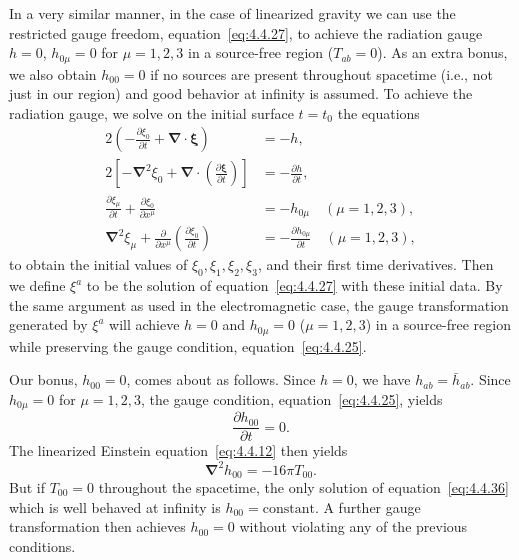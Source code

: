 In a very similar manner, in the case of linearized gravity we can use the restricted
gauge freedom, equation~\eqref{eq:4.4.27}, to achieve the radiation gauge
\(h=0\), \(h_{0\mu}=0\) for \(\mu=1,2,3\) in a source-free region
(\(T_{ab}=0\)). As an extra bonus, we also obtain \(h_{00}=0\) if no sources are
present throughout spacetime (i.e., not just in our region) and good behavior at
infinity is assumed. To achieve the radiation gauge, we solve on the initial surface
\(t=t_0\) the equations
\begin{align}
  2\left(-\frac{\partial\xi_0}{\partial t}
    +\boldsymbol{\nabla}\mathbin{\cdot}\boldsymbol{\xi}\right)&=-h ,
    \tag{4.4.34a}\label{eq:4.4.34a}\\
  2\left[-\boldsymbol{\nabla}^2\xi_0
    +\boldsymbol{\nabla}\mathbin{\cdot}
      \left(\frac{\partial\boldsymbol{\xi}}{\partial t}\right)\right]
    &=-\frac{\partial h}{\partial t} ,
    \tag{4.4.34b}\label{eq:4.4.34b}\\
  \frac{\partial\xi_\mu}{\partial t}
    +\frac{\partial\xi_0}{\partial x^\mu}&=-h_{0\mu}
    \quad(\mu=1,2,3) ,
    \tag{4.4.34c}\label{eq:4.4.34c}\\
  \boldsymbol{\nabla}^2\xi_\mu
    +\frac{\partial}{\partial x^\mu}
      \left(\frac{\partial\xi_0}{\partial t}\right)
    &=-\frac{\partial h_{0\mu}}{\partial t}
    \quad(\mu=1,2,3) ,
    \tag{4.4.34d}\label{eq:4.4.34d}
\end{align}
to obtain the initial values of \(\xi_0,\xi_1,\xi_2,\xi_3\), and their first time
derivatives. Then we define \(\xi^a\) to be the solution of
equation~\eqref{eq:4.4.27} with these initial data. By the same argument as used in
the electromagnetic case, the gauge transformation generated by \(\xi^a\) will
achieve \(h=0\) and \(h_{0\mu}=0\) (\(\mu=1,2,3\)) in a source-free region while
preserving the gauge condition, equation~\eqref{eq:4.4.25}.

Our bonus, \(h_{00}=0\), comes about as follows. Since \(h=0\), we have
\(h_{ab}=\bar h_{ab}\). Since \(h_{0\mu}=0\) for \(\mu=1,2,3\), the gauge
condition, equation~\eqref{eq:4.4.25}, yields
\begin{equation}
  \frac{\partial h_{00}}{\partial t}=0 .
  \tag{4.4.35}\label{eq:4.4.35}
\end{equation}
The linearized Einstein equation~\eqref{eq:4.4.12} then yields
\begin{equation}
  \boldsymbol{\nabla}^2h_{00}=-16\pi T_{00} .
  \tag{4.4.36}\label{eq:4.4.36}
\end{equation}
But if \(T_{00}=0\) throughout the spacetime, the only solution of
equation~\eqref{eq:4.4.36} which is well behaved at infinity is
\(h_{00}=\text{constant}\). A further gauge transformation then achieves
\(h_{00}=0\) without violating any of the previous conditions.

